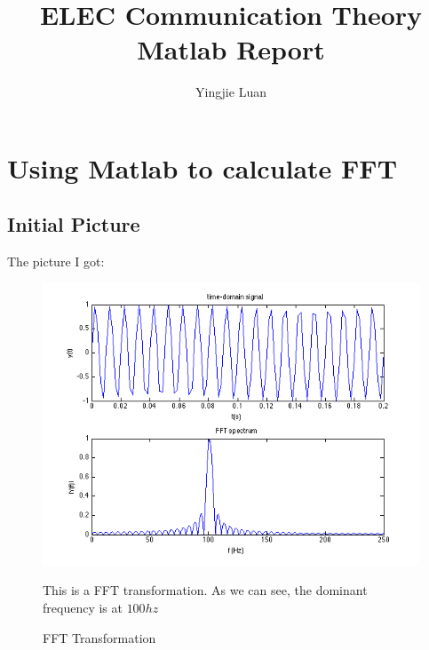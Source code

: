 \documentclass[11pt]{article}
\begin{document}
\title{ELEC Communication Theory Matlab Report}
\author{Yingjie Luan}
\maketitle

\tableofcontents



\section{Using Matlab to calculate FFT}

\subsection{Initial Picture}
\FloatBarrier
The picture I got:

\begin{figure}[h!]
\includegraphics[scale=0.75]{ELEC_1.png}
\caption{FFT Transformation}
\begin{minipage}{0.75\textwidth}
{\footnotesize This is a FFT transformation. As we can see, the dominant frequency is at $100hz$}
\end{minipage}
\end{figure}
\FloatBarrier

\FloatBarrier
\end{document}
